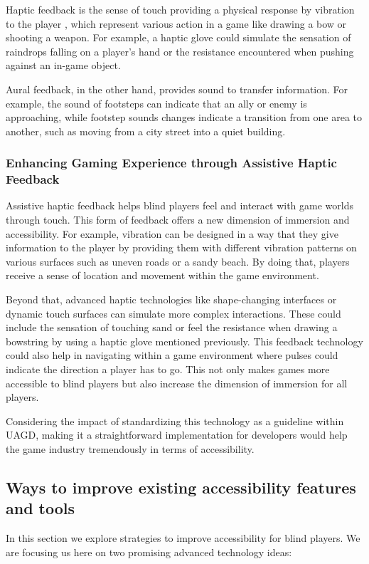 \documentclass[sigconf,natbib=false,10pt]{acmart}
\begin{document}
	Haptic feedback is the sense of touch providing a physical response by vibration to the player \cite{chen_gamepad_2024, kuber_towards_2007, bello_haptics_2016}, which represent various action in a game like drawing a bow or shooting a weapon.
	For example, a haptic glove could simulate the sensation of raindrops falling on a player's hand or the resistance encountered when pushing against an in-game object.
	
	Aural feedback, in the other hand, provides sound to transfer information.
	For example, the sound of footsteps can indicate that an ally or enemy is approaching, while footstep sounds changes indicate a transition from one area to another, such as moving from a city street into a quiet building.
	
	\subsubsection{Enhancing Gaming Experience through Assistive Haptic Feedback}
	Assistive haptic feedback helps blind players feel and interact with game worlds through touch.
	This form of feedback offers a new dimension of immersion and accessibility.
	For example, vibration can be designed in a way that they give information to the player by providing them with different vibration patterns on various surfaces such as uneven roads or a sandy beach.
	By doing that, players receive a sense of location and movement within the game environment.
	
	Beyond that, advanced haptic technologies like shape-changing interfaces or dynamic touch surfaces \cite{rasmussen_shape-changing_2012} can simulate more complex interactions.
	These could include the sensation of touching sand or feel the resistance when drawing a bowstring by using a haptic glove mentioned previously.
	This feedback technology could also help in navigating within a game environment where pulses could indicate the direction a player has to go.
	This not only makes games more accessible to blind players but also increase the dimension of immersion for all players.
	
	Considering the impact of standardizing this technology as a guideline within UAGD, making it a straightforward implementation for developers would help the game industry tremendously in terms of accessibility.
	
	\subsection{Ways to improve existing accessibility features and tools} \label{subsec:improvements}
	In this section we explore strategies to improve accessibility for blind players.
	We are focusing us here on two promising advanced technology ideas:
	
\end{document}
